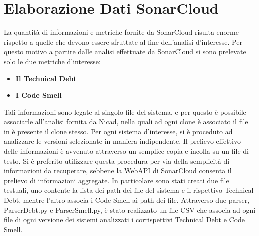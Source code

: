 \section{Elaborazione Dati SonarCloud}
La quantità di informazioni e metriche fornite da SonarCloud risulta enorme rispetto a quelle che devono essere sfruttate al fine dell'analisi d'interesse. Per questo motivo a partire dalle analisi effettuate da SonarCloud si sono prelevate solo le due metriche d'interesse:
\begin{itemize}
	\item \textbf{Il Technical Debt} 
	\item \textbf{I Code Smell}
\end{itemize}
Tali informazioni sono legate al singolo file del sistema, e per questo è possibile associarle all'analisi fornita da Nicad, nella quali ad ogni clone è associato il file in è presente il clone stesso. Per ogni sistema d'interesse, si è proceduto ad analizzare le versioni selezionate in maniera indipendente. Il prelievo effettivo delle informazioni è avvenuto attraverso un semplice copia e incolla su un file di testo. Si è preferito utilizzare questa procedura per via della semplicità di informazioni da recuperare, sebbene la WebAPI di SonarCloud consenta il prelievo di informazioni aggregate.
In particolare sono stati creati due file testuali, uno contente la lista dei path dei file del sistema e il rispettivo Technical Debt, mentre l'altro associa i Code Smell ai path dei file. Attraverso due parser, ParserDebt.py e ParserSmell.py, è stato realizzato un file CSV che associa ad ogni file di ogni versione dei sistemi analizzati i corrispettivi Technical Debt e Code Smell.